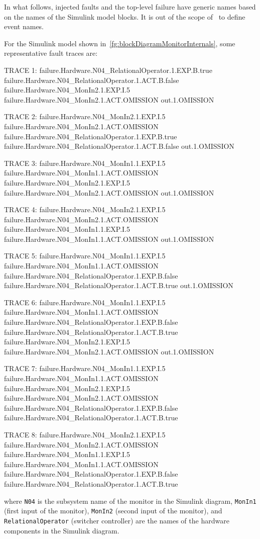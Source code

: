 \documentclass[12pt,openright,twoside,a4paper,oldfontcommands,english,brazil,final]{abntex2}
\theoremstyle{theo}
\newenvironment{snippetcspm}[1][2]
{
\ifthenelse{\equal{#1}{0}}
    {\tiny}
    {
    \ifthenelse{\equal{#1}{1}}
        {\scriptsize}
        {
        \ifthenelse{\equal{#1}{2}}
            {\footnotesize}
            {\small}
        }
    }
\verbatim
}
{
\endverbatim
}
\newcommand{\simulink}{Simulink\xspace}
\begin{document}
In what follows, injected faults and the top-level failure have generic names based on the names of the \simulink model blocks.
It is out of the scope of~\cite{DM2012} to define event names.

For the \simulink model shown in~\cref{fg:blockDiagramMonitorInternals}, some representative fault traces are:

\begin{snippetcspm}[1]
TRACE 1:
failure.Hardware.N04_RelationalOperator.1.EXP.B.true
failure.Hardware.N04_RelationalOperator.1.ACT.B.false
failure.Hardware.N04_MonIn2.1.EXP.I.5
failure.Hardware.N04_MonIn2.1.ACT.OMISSION
out.1.OMISSION

TRACE 2:
failure.Hardware.N04_MonIn2.1.EXP.I.5
failure.Hardware.N04_MonIn2.1.ACT.OMISSION
failure.Hardware.N04_RelationalOperator.1.EXP.B.true
failure.Hardware.N04_RelationalOperator.1.ACT.B.false
out.1.OMISSION

TRACE 3:
failure.Hardware.N04_MonIn1.1.EXP.I.5
failure.Hardware.N04_MonIn1.1.ACT.OMISSION
failure.Hardware.N04_MonIn2.1.EXP.I.5
failure.Hardware.N04_MonIn2.1.ACT.OMISSION
out.1.OMISSION

TRACE 4:
failure.Hardware.N04_MonIn2.1.EXP.I.5
failure.Hardware.N04_MonIn2.1.ACT.OMISSION
failure.Hardware.N04_MonIn1.1.EXP.I.5
failure.Hardware.N04_MonIn1.1.ACT.OMISSION
out.1.OMISSION

TRACE 5:
failure.Hardware.N04_MonIn1.1.EXP.I.5
failure.Hardware.N04_MonIn1.1.ACT.OMISSION
failure.Hardware.N04_RelationalOperator.1.EXP.B.false
failure.Hardware.N04_RelationalOperator.1.ACT.B.true
out.1.OMISSION

TRACE 6:
failure.Hardware.N04_MonIn1.1.EXP.I.5
failure.Hardware.N04_MonIn1.1.ACT.OMISSION
failure.Hardware.N04_RelationalOperator.1.EXP.B.false
failure.Hardware.N04_RelationalOperator.1.ACT.B.true
failure.Hardware.N04_MonIn2.1.EXP.I.5
failure.Hardware.N04_MonIn2.1.ACT.OMISSION
out.1.OMISSION

TRACE 7:
failure.Hardware.N04_MonIn1.1.EXP.I.5
failure.Hardware.N04_MonIn1.1.ACT.OMISSION
failure.Hardware.N04_MonIn2.1.EXP.I.5
failure.Hardware.N04_MonIn2.1.ACT.OMISSION
failure.Hardware.N04_RelationalOperator.1.EXP.B.false
failure.Hardware.N04_RelationalOperator.1.ACT.B.true

TRACE 8:
failure.Hardware.N04_MonIn2.1.EXP.I.5
failure.Hardware.N04_MonIn2.1.ACT.OMISSION
failure.Hardware.N04_MonIn1.1.EXP.I.5
failure.Hardware.N04_MonIn1.1.ACT.OMISSION
failure.Hardware.N04_RelationalOperator.1.EXP.B.false
failure.Hardware.N04_RelationalOperator.1.ACT.B.true
\end{snippetcspm}
%
where \verb$N04$ is the subsystem name of the monitor in the \simulink diagram, \verb$MonIn1$ (first input of the monitor), \verb$MonIn2$ (second input of the monitor), and \verb$RelationalOperator$ (switcher controller) are the names of the hardware components in the \simulink diagram.
\end{document}

